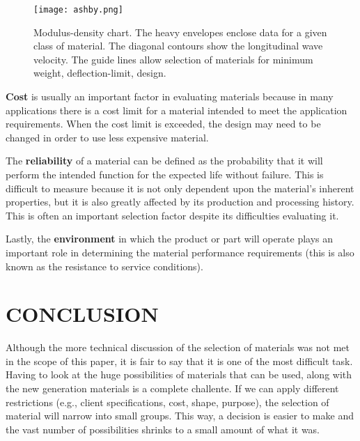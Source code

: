 \documentclass[letterpaper]{article}
\begin{document}
\begin{multicols}{2}
	\begin{figure}[H]
		\centering
		\texttt{[image: ashby.png]}
		\caption{Modulus-density chart. The heavy envelopes enclose data for a given class of material. The diagonal contours show the longitudinal wave velocity. The guide lines allow selection of materials for minimum weight, deflection-limit, design.}
	\end{figure}
	\textbf{Cost} is usually an important factor in evaluating materials because in many applications there is a cost limit for a material intended to meet the application requirements. When the cost limit is exceeded, the design may need to be changed in order to use less expensive material.

	The \textbf{reliability} of a material can be defined as the probability that it will perform the intended function for the expected life without failure. This is difficult to measure because it is not only dependent upon the material's inherent properties, but it is also greatly affected by its production and processing history. This is often an important selection factor despite its difficulties evaluating it.

	Lastly, the \textbf{environment} in which the product or part will operate plays an important role in determining the material performance requirements (this is also known as the resistance to service conditions).\supercite{kutz02}
	\section{CONCLUSION}
	Although the more technical discussion of the selection of materials was not met in the scope of this paper, it is fair to say that it is one of the most difficult task. Having to look at the huge possibilities of materials that can be used, along with the new generation materials is a complete challente. If we can apply different restrictions (e.g., client specifications, cost, shape, purpose), the selection of material will narrow into small groups. This way, a decision is easier to make and the vast number of possibilities shrinks to a small amount of what it was.
\end{multicols}
\renewcommand\refname{REFERENCES}
\printbibliography
\end{document}
